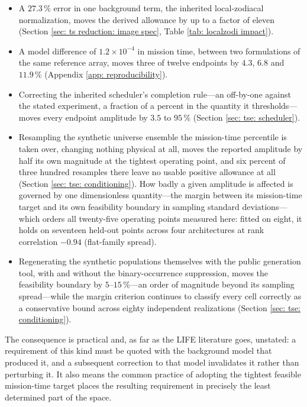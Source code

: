 \documentclass[12pt,a4paper]{article}
\numberwithin{equation}{section}
\numberwithin{figure}{section}
\numberwithin{table}{section}
\begin{document}
\begin{itemize}
    \item A $27.3\,\%$ error in one background term, the inherited local-zodiacal normalization, moves the derived allowance by up to a factor of eleven (Section \ref{sec: ts reduction: image spec}, Table \ref{tab: localzodi impact}).
    \item A model difference of $1.2\times10^{-4}$ in mission time, between two formulations of the same reference array, moves three of twelve endpoints by $4.3$, $6.8$ and $11.9\,\%$ (Appendix \ref{app: reproducibility}).
    \item Correcting the inherited scheduler's completion rule---an off-by-one against the stated experiment, a fraction of a percent in the quantity it thresholds---moves every endpoint amplitude by $3.5$ to $95\,\%$ (Section \ref{sec: tse: scheduler}).
    \item Resampling the synthetic universe ensemble the mission-time percentile is taken over, changing nothing physical at all, moves the reported amplitude by half its own magnitude at the tightest operating point, and six percent of three hundred resamples there leave no usable positive allowance at all (Section \ref{sec: tse: conditioning}). How badly a given amplitude is affected is governed by one dimensionless quantity---the margin between its mission-time target and its own feasibility boundary in sampling standard deviations---which orders all twenty-five operating points measured here: fitted on eight, it holds on seventeen held-out points across four architectures at rank correlation $-0.94$ (flat-family spread).
    \item Regenerating the synthetic populations themselves with the public generation tool, with and without the binary-occurrence suppression, moves the feasibility boundary by $5$--$15\,\%$---an order of magnitude beyond its sampling spread---while the margin criterion continues to classify every cell correctly as a conservative bound across eighty independent realizations (Section \ref{sec: tse: conditioning}).
\end{itemize}

The consequence is practical and, as far as the LIFE literature goes, unstated: a requirement of this kind must be quoted with the background model that produced it, and a subsequent correction to that model invalidates it rather than perturbing it. It also means the common practice of adopting the tightest feasible mission-time target places the resulting requirement in precisely the least determined part of the space.
\end{document}
